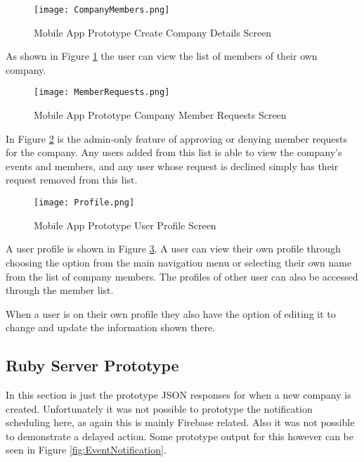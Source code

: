 \clearpage
\begin{figure}[ht]
  \centering
      \texttt{[image: CompanyMembers.png]}
  \caption[Mobile App Prototype Company Details Screen]{Mobile App Prototype Create Company Details Screen}
  \label{fig:CompanyDetails}
\end{figure}

As shown in Figure \ref{fig:CompanyDetails} the user can view the list of members of their own company.

\clearpage
\begin{figure}[ht]
  \centering
      \texttt{[image: MemberRequests.png]}
  \caption[Mobile App Prototype Company Member Requests Screen]{Mobile App Prototype Company Member Requests Screen}
  \label{fig:MemberRequests}
\end{figure}

In Figure \ref{fig:MemberRequests} is the admin-only feature of approving or denying member requests for the company. Any users added from this list is able to view the company's events and members, and any user whose request is declined simply has their request removed from this list.

\clearpage
\begin{figure}[ht]
  \centering
      \texttt{[image: Profile.png]}
  \caption[Mobile App Prototype User Profile Screen]{Mobile App Prototype User Profile Screen}
  \label{fig:UserProfile}
\end{figure}

A user profile is shown in Figure \ref{fig:UserProfile}. A user can view their own profile through choosing the option from the main navigation menu or selecting their own name from the list of company members. The profiles of other user can also be accessed through the member list. 

When a user is on their own profile they also have the option of editing it to change and update the information shown there.

\clearpage %
\subsection{Ruby Server Prototype}

In this section is just the prototype JSON responses for when a new company is created. Unfortunately it was not possible to prototype the notification scheduling here, as again this is mainly Firebase related. Also it was not possible to demonstrate a delayed action. Some prototype output for this however can be seen in Figure \ref{fig:EventNotification}.

